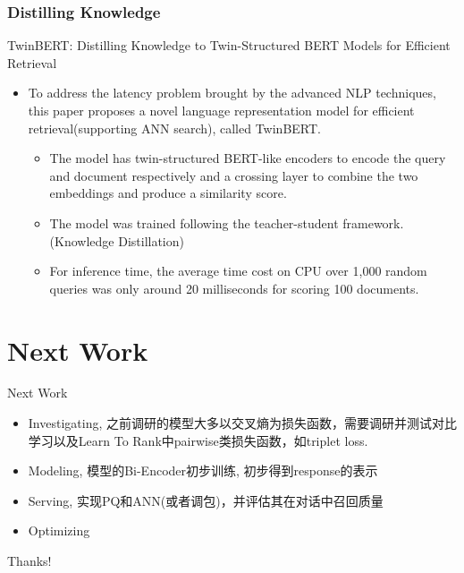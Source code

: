 \documentclass{beamer}
\begin{document}
\subsubsection{Distilling Knowledge}
\begin{frame}{TwinBERT: Distilling Knowledge to Twin-Structured BERT Models for Efficient Retrieval}

\begin{itemize}
    \item To address the latency problem brought by the advanced NLP techniques, this paper proposes a novel language representation model for efficient retrieval(supporting ANN search), called TwinBERT.
    \begin{itemize}
        \item  The model has twin-structured BERT-like encoders to encode the query and document respectively and a crossing layer to combine the two embeddings and produce a similarity score.
        \item The model was trained following the teacher-student framework. (Knowledge Distillation)
        \item For inference time, the average time cost on CPU over 1,000 random queries was only around 20 milliseconds for scoring 100 documents.
    \end{itemize}
\end{itemize}

\end{frame}

\section{Next Work}
\begin{frame}{Next Work}
    \begin{itemize}
        \item Investigating, 之前调研的模型大多以交叉熵为损失函数，需要调研并测试对比学习以及Learn To Rank中pairwise类损失函数，如triplet loss.
        \item Modeling, 模型的Bi-Encoder初步训练, 初步得到response的表示
        \item Serving, 实现PQ和ANN(或者调包)，并评估其在对话中召回质量
        \item Optimizing
    \end{itemize}
\end{frame}

\begin{frame}
    \begin{center}
        {\Huge\calligra Thanks!}
    \end{center}
\end{frame}
\end{document}

